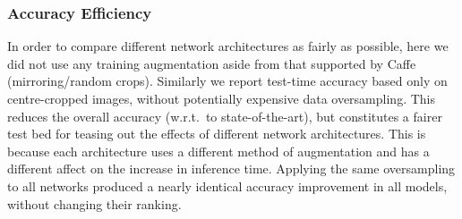 \documentclass[thesis]{subfiles}
\begin{document}
	\subsubsection{Accuracy \vs{}Efficiency}
	In order to compare different network architectures as fairly as possible, here we did not use any training
	augmentation aside from that supported by Caffe~\citep{Jia2014} (mirroring/random crops). Similarly we report test-time 
	accuracy based only on centre-cropped images, without potentially expensive data oversampling. 
	This reduces the overall accuracy (w.r.t.\ to state-of-the-art), but constitutes a fairer test bed for teasing out the effects of different network architectures. This is because each architecture uses a different method of augmentation and has a different affect on the increase in inference time.
	Applying the same oversampling to all networks produced a nearly identical accuracy improvement in 
	all models, without changing their ranking.
\end{document}
